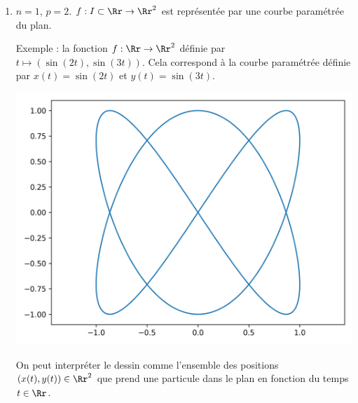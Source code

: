 \documentclass[11pt, class=report,crop=false]{standalone}
\begin{document}
\begin{exemple}
\sauteligne
\begin{enumerate}
 
\item $n=1$, $p=2$. $f: I \subset \Rr \rightarrow \Rr^2$ 
est représentée par une courbe paramétrée du plan.

Exemple : la fonction $f : \Rr \to \Rr^2$ définie par $t \mapsto (\sin(2t),\sin(3t))$.
Cela correspond à la courbe paramétrée définie par $x(t) = \sin(2t)$ et $y(t) = \sin(3t)$.
 
\begin{center}
    \includegraphics[scale=\myscale,scale=0.5]{figures/fonctions-intro-03}
\end{center}


On peut interpréter le dessin comme l'ensemble des positions $(x(t),y(t)) \in \Rr^2$ que prend une particule dans le plan en fonction du temps $t \in \Rr$. 


\end{enumerate}
\end{exemple}
\end{document}
